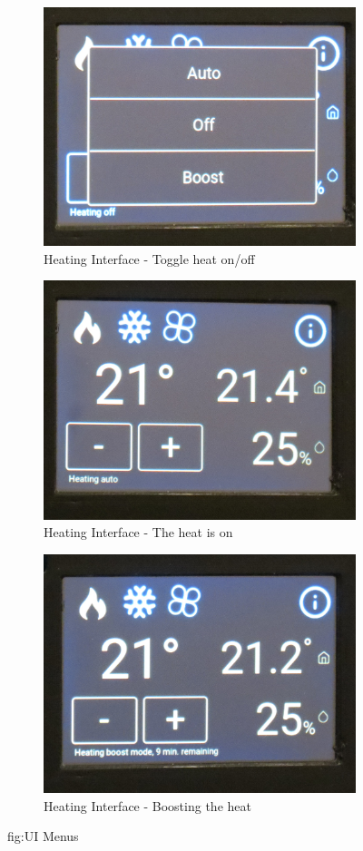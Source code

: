 \begin{figure}
\begin{subfigure}{0.5\textwidth}
  \centering
  \includegraphics[width=.75\linewidth]{img/ui-heating-menu.jpg}
  \caption{Heating Interface - Toggle heat on/off}
  \label{fig:ui-heating-menu}
\end{subfigure}%
\begin{subfigure}{0.5\textwidth}
  \centering
  \includegraphics[width=.75\linewidth]{img/ui-heating-on.jpg}
  \caption{Heating Interface - The heat is on}
  \label{fig:ui-heating-on}
\end{subfigure}

\begin{subfigure}{0.5\textwidth}
  \centering
  \includegraphics[width=.75\linewidth]{img/ui-heating-boost.jpg}
  \caption{Heating Interface - Boosting the heat}
  \label{fig:ui-heating-boost}
\end{subfigure}
\caption{fig:UI Menus}
\end{figure}


